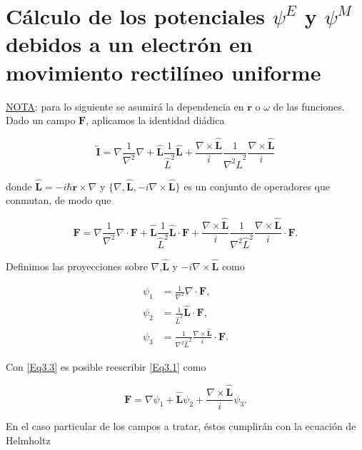 \documentclass[a4paper,10pt]{article}
\newcommand{\ten}[1] {\overleftrightarrow{\textbf{#1}}} %
\newcommand{\hatbf}[1] {\hat{\mathbf{#1}}}	%
\begin{document}
\section{\large{Cálculo de los potenciales $\psi^E$ y $\psi^M$ debidos a un electrón en movimiento rectilíneo uniforme}}

\setcounter{equation}{0}

\underline{NOTA}: para lo siguiente se asumirá la dependencia en $\textbf{r}$ o $\omega$ de las funciones.
\\
Dado un campo $\textbf{F}$, aplicamos la identidad diádica 

\begin{equation}
\ten{I}=\nabla\frac{1}{\nabla^2}\nabla+\hatbf{L}\frac{1}{\hat{L}^2}\hatbf{L}+\frac{\nabla\times\hatbf{L}}{i}\frac{1}{\nabla^2\hat{L}^2}\frac{\nabla\times\hatbf{L}}{i}
\label{Eq3.1}
\end{equation}

donde $\hatbf{L}=-i\hbar\textbf{r}\times\nabla$ y $\{\nabla,\hatbf{L},-i\nabla\times\hatbf{L}\}$ es un conjunto de operadores que conmutan, de modo que

\begin{equation}
\textbf{F}=\nabla\frac{1}{\nabla^2}\nabla\cdot\textbf{F}+\hatbf{L}\frac{1}{\hat{L}^2}\hatbf{L}\cdot\textbf{F}+\frac{\nabla\times\hatbf{L}}{i}\frac{1}{\nabla^2\hat{L}^2}\frac{\nabla\times\hatbf{L}}{i}\cdot\textbf{F}.
\end{equation}

Definimos las proyecciones sobre $\nabla$,$\hatbf{L}$ y $-i\nabla\times\hatbf{L}$ como

\begin{subequations}
\begin{align}
\psi_1	&=\frac{1}{\nabla^2}\nabla\cdot\textbf{F},	\\
\psi_2	&=\frac{1}{\hat{L}^2}\hatbf{L}\cdot\textbf{F},	\\
\psi_3	&=\frac{1}{\nabla^2\hat{L}^2}\frac{\nabla\times\hatbf{L}}{i}\cdot\textbf{F}.
\end{align}
\label{Eq3.3}
\end{subequations}

Con \eqref{Eq3.3} es posible reescribir \eqref{Eq3.1} como

\begin{equation}
\textbf{F}=\nabla\psi_1+\hatbf{L}\psi_2+\frac{\nabla\times\hatbf{L}}{i}\psi_3.
\end{equation}

En el caso particular de los campos a tratar, éstos cumplirán con la ecuación de Helmholtz
\end{document}
